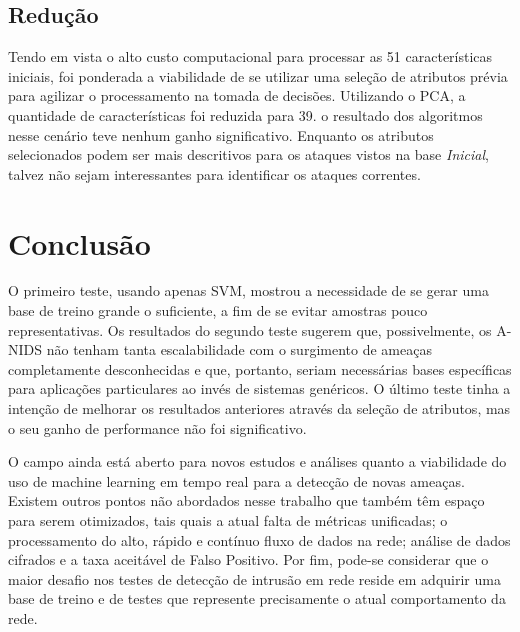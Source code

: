 \documentclass[12pt,a4paper]{article}
\begin{document}
    \subsection{Redução}
    Tendo em vista o alto custo computacional para processar as 51 características iniciais, foi ponderada a viabilidade
    de se utilizar uma seleção de atributos prévia para agilizar o processamento na tomada de decisões. Utilizando o
    PCA, a quantidade de características foi reduzida para 39.
    o resultado dos algoritmos nesse cenário teve nenhum ganho significativo. Enquanto os atributos selecionados podem
    ser mais descritivos para os ataques vistos na base \textit{Inicial}, talvez não sejam interessantes para
    identificar os ataques correntes.


\section{Conclusão}
    \par O primeiro teste, usando apenas SVM, mostrou a necessidade de se gerar uma base de treino grande o suficiente, a
    fim de se evitar amostras pouco representativas. Os resultados do segundo teste sugerem que, possivelmente, os A-NIDS
    não tenham tanta escalabilidade com o surgimento de ameaças completamente desconhecidas e que, portanto, seriam
    necessárias bases específicas para aplicações particulares ao invés de sistemas genéricos. O último teste tinha a
    intenção de melhorar os resultados anteriores através da seleção de atributos, mas o seu ganho de performance não foi
    significativo.
    \par O campo ainda está aberto para novos estudos e análises quanto a viabilidade do uso de machine learning em tempo
    real para a detecção de novas ameaças. Existem outros pontos não abordados nesse trabalho que também têm espaço para
    serem otimizados, tais quais a atual falta de métricas unificadas; o processamento do alto, rápido e contínuo fluxo de
    dados na rede; análise de dados cifrados e a taxa aceitável de Falso Positivo. Por fim, pode-se considerar que
     o maior desafio nos testes de detecção de intrusão em rede reside em adquirir uma base de treino e de testes que
 represente precisamente o atual comportamento da rede.
\end{document}
